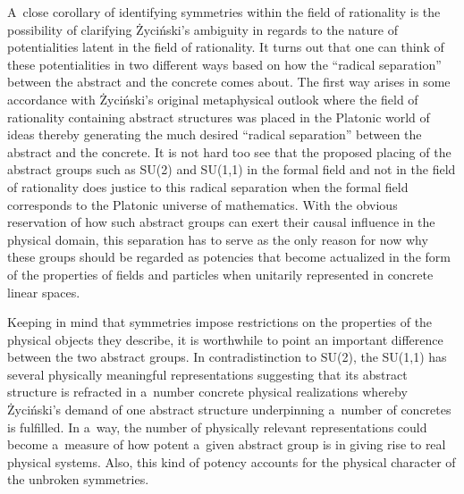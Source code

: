 A~close corollary of identifying symmetries within the field of rationality is the possibility of clarifying Życiński's ambiguity in regards to the nature of potentialities latent in the field of rationality. It turns out that one can think of these potentialities in two different ways based on how the ``radical separation'' between the abstract and the concrete comes about. The first way arises in some accordance with Życiński's original metaphysical outlook where the field of rationality containing abstract structures was placed in the Platonic world of ideas thereby generating the much desired ``radical separation'' between the abstract and the concrete. It is not hard too see that the proposed placing of the abstract groups such as SU(2) and SU(1,1) in the formal field and not in the field of rationality does justice to this radical separation when the formal field corresponds to the Platonic universe of mathematics. With the obvious reservation of how such abstract groups can exert their causal influence in the physical domain, this separation has to serve as the only reason for now why these groups should be regarded as potencies that become actualized in the form of the properties of fields and particles when unitarily represented in concrete linear spaces.



Keeping in mind that symmetries impose restrictions on the properties of the physical objects they describe, it is worthwhile to point an important difference between the two abstract groups. In contradistinction to SU(2), the SU(1,1) has several physically meaningful representations suggesting that its abstract structure is refracted in a~number concrete physical realizations whereby Życiński's demand of one abstract structure underpinning a~number of concretes is fulfilled. In a~way, the number of physically relevant representations could become a~measure of how potent a~given abstract group is in giving rise to real physical systems. Also, this kind of potency accounts for the physical character of the unbroken symmetries.



